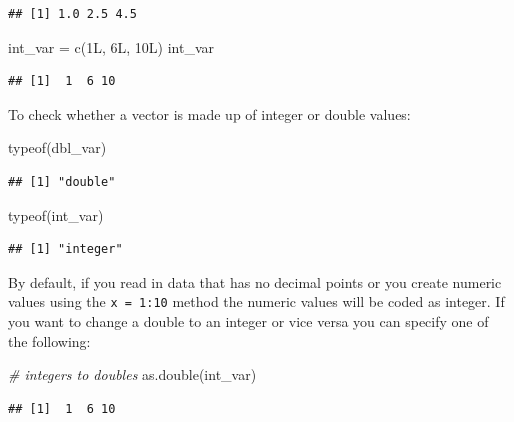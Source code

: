 \documentclass[
]{book}
\newenvironment{Shaded}{\begin{snugshade}}{\end{snugshade}}
\newcommand{\CommentTok}[1]{\textcolor[rgb]{0.56,0.35,0.01}{\textit{#1}}}
\newcommand{\FunctionTok}[1]{\textcolor[rgb]{0.00,0.00,0.00}{#1}}
\newcommand{\NormalTok}[1]{#1}
\newcommand{\OtherTok}[1]{\textcolor[rgb]{0.56,0.35,0.01}{#1}}
\begin{document}
\begin{verbatim}
## [1] 1.0 2.5 4.5
\end{verbatim}

\begin{Shaded}
\begin{Highlighting}[]
\NormalTok{int\_var }\OtherTok{=} \FunctionTok{c}\NormalTok{(1L, 6L, 10L)}
\NormalTok{int\_var}
\end{Highlighting}
\end{Shaded}

\begin{verbatim}
## [1]  1  6 10
\end{verbatim}

To check whether a vector is made up of integer or double values:

\begin{Shaded}
\begin{Highlighting}[]
\FunctionTok{typeof}\NormalTok{(dbl\_var)}
\end{Highlighting}
\end{Shaded}

\begin{verbatim}
## [1] "double"
\end{verbatim}

\begin{Shaded}
\begin{Highlighting}[]
\FunctionTok{typeof}\NormalTok{(int\_var)}
\end{Highlighting}
\end{Shaded}

\begin{verbatim}
## [1] "integer"
\end{verbatim}

By default, if you read in data that has no decimal points or you create numeric values using the \texttt{x\ =\ 1:10} method the numeric values will be coded as integer. If you want to change a double to an integer or vice versa you can specify one of the following:

\begin{Shaded}
\begin{Highlighting}[]
\CommentTok{\# integers to doubles}
\FunctionTok{as.double}\NormalTok{(int\_var)}
\end{Highlighting}
\end{Shaded}

\begin{verbatim}
## [1]  1  6 10
\end{verbatim}
\end{document}
